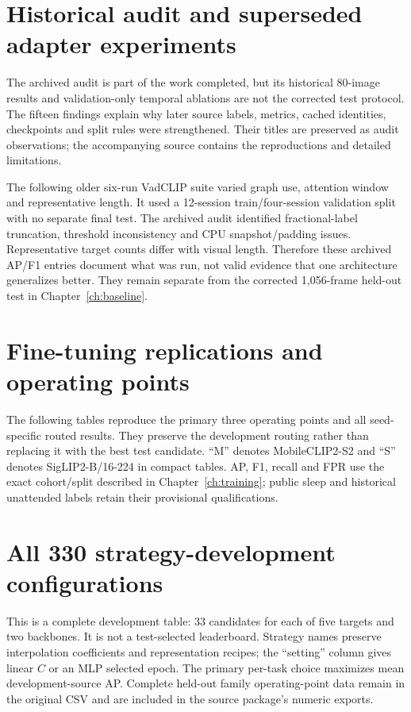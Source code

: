 \chapter{Historical audit and superseded adapter experiments}
The archived audit is part of the work completed, but its historical 80-image results and validation-only temporal ablations are not the corrected test protocol. The fifteen findings explain why later source labels, metrics, cached identities, checkpoints and split rules were strengthened. Their titles are preserved as audit observations; the accompanying source contains the reproductions and detailed limitations.


The following older six-run VadCLIP suite varied graph use, attention window and representative length. It used a 12-session train/four-session validation split with no separate final test. The archived audit identified fractional-label truncation, threshold inconsistency and CPU snapshot/padding issues. Representative target counts differ with visual length. Therefore these archived AP/F1 entries document what was run, not valid evidence that one architecture generalizes better. They remain separate from the corrected 1,056-frame held-out test in Chapter~\ref{ch:baseline}.


\chapter{Fine-tuning replications and operating points}
The following tables reproduce the primary three operating points and all seed-specific routed results. They preserve the development routing rather than replacing it with the best test candidate. ``M'' denotes MobileCLIP2-S2 and ``S'' denotes SigLIP2-B/16-224 in compact tables. AP, F1, recall and FPR use the exact cohort/split described in Chapter~\ref{ch:training}; public sleep and historical unattended labels retain their provisional qualifications.



\chapter{All 330 strategy-development configurations}
This is a complete development table: 33 candidates for each of five targets and two backbones. It is not a test-selected leaderboard. Strategy names preserve interpolation coefficients and representation recipes; the ``setting'' column gives linear $C$ or an MLP selected epoch. The primary per-task choice maximizes mean development-source AP. Complete held-out family operating-point data remain in the original CSV and are included in the source package's numeric exports.


